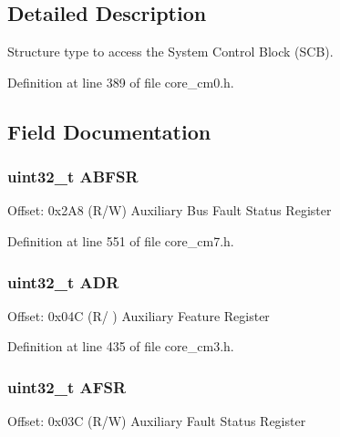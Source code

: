 \subsection{Detailed Description}
Structure type to access the System Control Block (S\+CB). 

Definition at line 389 of file core\+\_\+cm0.\+h.



\subsection{Field Documentation}
\subsubsection[{\texorpdfstring{A\+B\+F\+SR}{ABFSR}}]{ uint32\+\_\+t A\+B\+F\+SR}\hypertarget{struct_s_c_b___type_aa104b9e01b129abe3de43c439916f655}{}\label{struct_s_c_b___type_aa104b9e01b129abe3de43c439916f655}
Offset\+: 0x2\+A8 (R/W) Auxiliary Bus Fault Status Register 

Definition at line 551 of file core\+\_\+cm7.\+h.

\subsubsection[{\texorpdfstring{A\+DR}{ADR}}]{ uint32\+\_\+t A\+DR}\hypertarget{struct_s_c_b___type_a72572af6d5dece4947453aeabd52575f}{}\label{struct_s_c_b___type_a72572af6d5dece4947453aeabd52575f}
Offset\+: 0x04C (R/ ) Auxiliary Feature Register 

Definition at line 435 of file core\+\_\+cm3.\+h.

\subsubsection[{\texorpdfstring{A\+F\+SR}{AFSR}}]{ uint32\+\_\+t A\+F\+SR}\hypertarget{struct_s_c_b___type_a3ef0057e48fdef798f2ee12125a80d9f}{}\label{struct_s_c_b___type_a3ef0057e48fdef798f2ee12125a80d9f}
Offset\+: 0x03C (R/W) Auxiliary Fault Status Register 

